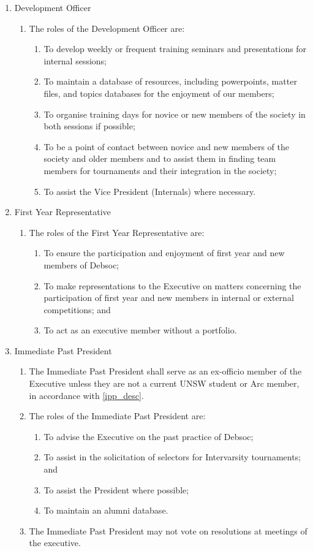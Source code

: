 \begin{enumerate}
\item Development Officer
  \begin{enumerate}
  \item The roles of the Development Officer are:
    \begin{enumerate}
    \item To develop weekly or frequent training seminars and presentations for internal sessions;
    \item To maintain a database of resources, including powerpoints, matter files, and topics databases for the enjoyment of our members;
    \item To organise training days for novice or new members of the society in both sessions if possible;
    \item To be a point of contact between novice and new members of the society and older members and to assist them in finding team members for tournaments and their integration in the society;
    \item To assist the Vice President (Internals) where necessary.
    \end{enumerate}
  \end{enumerate}

\item First Year Representative
  \begin{enumerate}
  \item The roles of the First Year Representative are:
    \begin{enumerate}
    \item To ensure the participation and enjoyment of first year and new members of Debsoc;
    \item To make representations to the Executive on matters concerning the participation of first year and new members in internal or external competitions; and
    \item To act as an executive member without a portfolio.
    \end{enumerate}
  \end{enumerate}

\item Immediate Past President
  \begin{enumerate}
  \item The Immediate Past President shall serve as an ex-officio member of the Executive unless they are not a current UNSW student or Arc member, in accordance with \ref{ipp_desc}.
  \item The roles of the Immediate Past President are:
    \begin{enumerate}
    \item To advise the Executive on the past practice of Debsoc;
    \item To assist in the solicitation of selectors for Intervarsity tournaments; and
    \item To assist the President where possible;
    \item To maintain an alumni database.
    \end{enumerate}
  \item The Immediate Past President may not vote on resolutions at meetings of the executive.
  \end{enumerate}


\end{enumerate}
